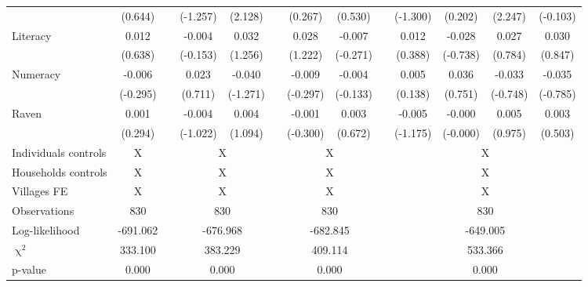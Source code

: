 \begin{table}[htbp]
{\begin{tabular}{lcccccccccccc}
      & (0.644) &   & (-1.257) & (2.128) &   & (0.267) & (0.530) &   & (-1.300) & (0.202) & (2.247) & (-0.103) \\
    Literacy & 0.012 &   & -0.004 & 0.032 &   & 0.028 & -0.007 &   & 0.012 & -0.028 & 0.027 & 0.030 \\
      & (0.638) &   & (-0.153) & (1.256) &   & (1.222) & (-0.271) &   & (0.388) & (-0.738) & (0.784) & (0.847) \\
    Numeracy & -0.006 &   & 0.023 & -0.040 &   & -0.009 & -0.004 &   & 0.005 & 0.036 & -0.033 & -0.035 \\
      & (-0.295) &   & (0.711) & (-1.271) &   & (-0.297) & (-0.133) &   & (0.138) & (0.751) & (-0.748) & (-0.785) \\
    Raven & 0.001 &   & -0.004 & 0.004 &   & -0.001 & 0.003 &   & -0.005 & -0.000 & 0.005 & 0.003 \\
      & (0.294) &   & (-1.022) & (1.094) &   & (-0.300) & (0.672) &   & (-1.175) & (-0.000) & (0.975) & (0.503) \\
    \midrule
    Individuals controls & \multicolumn{1}{c}{X} &       & \multicolumn{2}{c}{X} &       & \multicolumn{2}{c}{X} &       & \multicolumn{4}{c}{X} \\
    Households controls & \multicolumn{1}{c}{X} &       & \multicolumn{2}{c}{X} &       & \multicolumn{2}{c}{X} &       & \multicolumn{4}{c}{X} \\
    Villages FE & \multicolumn{1}{c}{X} &       & \multicolumn{2}{c}{X} &       & \multicolumn{2}{c}{X} &       & \multicolumn{4}{c}{X} \\
    \midrule
    Observations & 830   &       & \multicolumn{2}{c}{830} &       & \multicolumn{2}{c}{830} &       & \multicolumn{4}{c}{830} \\
    Log-likelihood & -691.062 &       & \multicolumn{2}{c}{-676.968} &       & \multicolumn{2}{c}{-682.845} &       & \multicolumn{4}{c}{-649.005} \\
    $\upchi^2$ & 333.100 &       & \multicolumn{2}{c}{383.229} &       & \multicolumn{2}{c}{409.114} &       & \multicolumn{4}{c}{533.366} \\
    p-value & 0.000 &       & \multicolumn{2}{c}{0.000} &       & \multicolumn{2}{c}{0.000} &       & \multicolumn{4}{c}{0.000} \\
    \bottomrule
    \end{tabular}%
    }
  \label{tab:ame_debtpath_b5}%
\end{table}%

